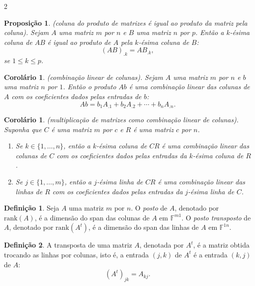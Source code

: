 \documentclass{article}
\theoremstyle{plain}
\newtheorem{prop}[thm]{Proposição}
\newtheorem{cor}[thm]{Corolário}
\theoremstyle{definition}
\newtheorem{defn}{Definição}[section]
\theoremstyle{remark}
\begin{document}
\begin{multicols}{2}
\begin{prop} (coluna do produto de matrizes é igual ao produto da matriz pela coluna).
    Sejam \(A\) uma matriz \(m\) por \(n\) e \(B\) uma matriz \(n\) por \(p\). Então a \(k\)-ésima coluna de \(AB\) é igual ao produto de \(A\) pela \(k\)-ésima coluna de \(B\):
    \[
        (AB)_{.k} = A B_{.k},
    \]
    \noindent se \(1 \leq k \leq p\).
\end{prop}

\begin{cor} (combinação linear de colunas).
    Sejam \(A\) uma matriz \(m\) por \(n\) e \(b\) uma matriz \(n\) por \(1\). Então o produto \(Ab\) é uma combinação linear das colunas de \(A\) com os coeficientes dados pelas entradas de \(b\):
    \[
        Ab = b_1 A_{.1} + b_2 A_{.2} + \cdots + b_n A_{.n}.
    \]
\end{cor}

\begin{cor} (multiplicação de matrizes como combinação linear de colunas).
    Suponha que \(C\) é uma matriz \(m\) por \(c\) e \(R\) é uma matriz \(c\) por \(n\).
    \begin{enumerate}
        \item[\textup{(a)}] Se \(k \in \{1, \ldots, n\}\), então a \(k\)-ésima coluna de \(CR\) é uma combinação linear das colunas de \(C\) com os coeficientes dados pelas entradas da \(k\)-ésima coluna de \(R\).
        \item[\textup{(b)}] Se \(j \in \{1, \ldots, m\}\), então a \(j\)-ésima linha de \(CR\) é uma combinação linear das linhas de \(R\) com os coeficientes dados pelas entradas da \(j\)-ésima linha de \(C\).
    \end{enumerate}
\end{cor}

\begin{defn}
    Seja \(A\) uma matriz \(m\) por \(n\). O \emph{posto} de \(A\), denotado por \(\text{rank}(A)\), é a dimensão do span das colunas de \(A\) em \(\mathbb{F}^{m1}\). O \emph{posto transposto} de \(A\), denotado por \(\text{rank}(A^t)\), é a dimensão do span das linhas de \(A\) em \(\mathbb{F}^{1n}\).
\end{defn}

\begin{defn}
    A transposta de uma matriz \(A\), denotada por \(A^t\), é a matriz obtida trocando as linhas por colunas, isto é, a entrada \((j, k)\) de \(A^t\) é a entrada \((k, j)\) de \(A\):
    \[
        (A^t)_{jk} = A_{kj}.
    \]
\end{defn}


\end{multicols}
\end{document}
